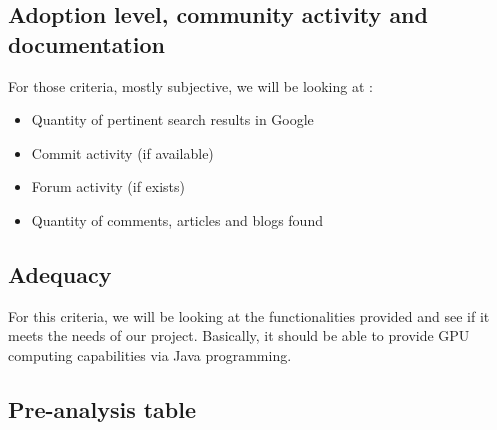 \subsection{Adoption level, community activity and documentation}

For those criteria, mostly subjective, we will be looking at :

\begin{itemize}
  \item Quantity of pertinent search results in Google
  \item Commit activity (if available)
  \item Forum activity (if exists)
  \item Quantity of comments, articles and blogs found
\end{itemize}

\subsection{Adequacy}

For this criteria, we will be looking at the functionalities provided and see if it meets the needs of our project. Basically, it should be able to provide GPU computing capabilities via Java programming.

\newpage

\subsection{Pre-analysis table} \label{pre analysis}

